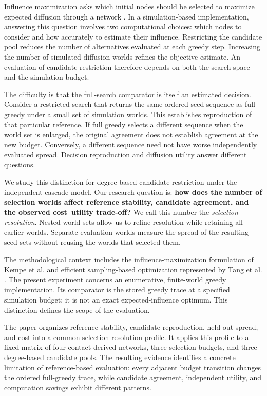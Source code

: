 \documentclass[smallextended]{svjour3}
\begin{document}
Influence maximization asks which initial nodes should be selected to maximize expected diffusion through a network \cite{ref1}. In a simulation-based implementation, answering this question involves two computational choices: which nodes to consider and how accurately to estimate their influence. Restricting the candidate pool reduces the number of alternatives evaluated at each greedy step. Increasing the number of simulated diffusion worlds refines the objective estimate. An evaluation of candidate restriction therefore depends on both the search space and the simulation budget.

The difficulty is that the full-search comparator is itself an estimated decision. Consider a restricted search that returns the same ordered seed sequence as full greedy under a small set of simulation worlds. This establishes reproduction of that particular reference. If full greedy selects a different sequence when the world set is enlarged, the original agreement does not establish agreement at the new budget. Conversely, a different sequence need not have worse independently evaluated spread. Decision reproduction and diffusion utility answer different questions.

We study this distinction for degree-based candidate restriction under the independent-cascade model. Our research question is: \textbf{how does the number of selection worlds affect reference stability, candidate agreement, and the observed cost--utility trade-off?} We call this number the \emph{selection resolution}. Nested world sets allow us to refine resolution while retaining all earlier worlds. Separate evaluation worlds measure the spread of the resulting seed sets without reusing the worlds that selected them.

The methodological context includes the influence-maximization formulation of Kempe et al. \cite{ref1} and efficient sampling-based optimization represented by Tang et al. \cite{ref2}. The present experiment concerns an enumerative, finite-world greedy implementation. Its comparator is the stored greedy trace at a specified simulation budget; it is not an exact expected-influence optimum. This distinction defines the scope of the evaluation.

The paper organizes reference stability, candidate reproduction, held-out spread, and cost into a common selection-resolution profile. It applies this profile to a fixed matrix of four contact-derived networks, three selection budgets, and three degree-based candidate pools. The resulting evidence identifies a concrete limitation of reference-based evaluation: every adjacent budget transition changes the ordered full-greedy trace, while candidate agreement, independent utility, and computation savings exhibit different patterns.
\end{document}

